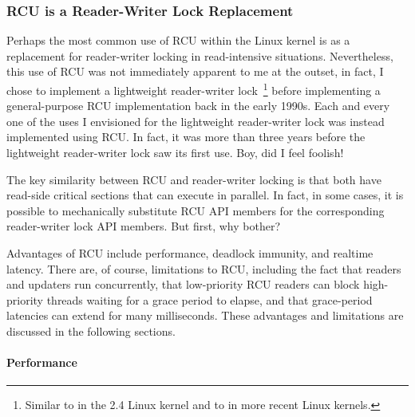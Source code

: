 \subsubsection{RCU is a Reader-Writer Lock Replacement}
\label{sec:defer:RCU is a Reader-Writer Lock Replacement}

Perhaps the most common use of RCU within the Linux kernel is as
a replacement for reader-writer locking in read-intensive situations.
Nevertheless, this use of RCU was not immediately apparent to me
at the outset, in fact, I chose to implement a lightweight reader-writer
lock~\cite{WilsonCHsieh92a}\footnote{
	Similar to  in the 2.4 Linux kernel and to
	 in more recent Linux kernels.}
before implementing a general-purpose RCU implementation
back in the early 1990s.
Each and every one of the uses I envisioned for the lightweight reader-writer
lock was instead implemented using RCU.
In fact, it was more than
three years before the lightweight reader-writer lock saw its first use.
Boy, did I feel foolish!

The key similarity between RCU and reader-writer locking is that
both have read-side critical sections that can execute in parallel.
In fact, in some cases, it is possible to mechanically substitute RCU API
members for the corresponding reader-writer lock API members.
But first, why bother?

Advantages of RCU include performance,
deadlock immunity, and realtime latency.
There are, of course, limitations to RCU, including the fact that
readers and updaters run concurrently, that low-priority RCU readers
can block high-priority threads waiting for a grace period to elapse,
and that grace-period latencies can extend for many milliseconds.
These advantages and limitations are discussed in the following sections.

\paragraph{Performance}

